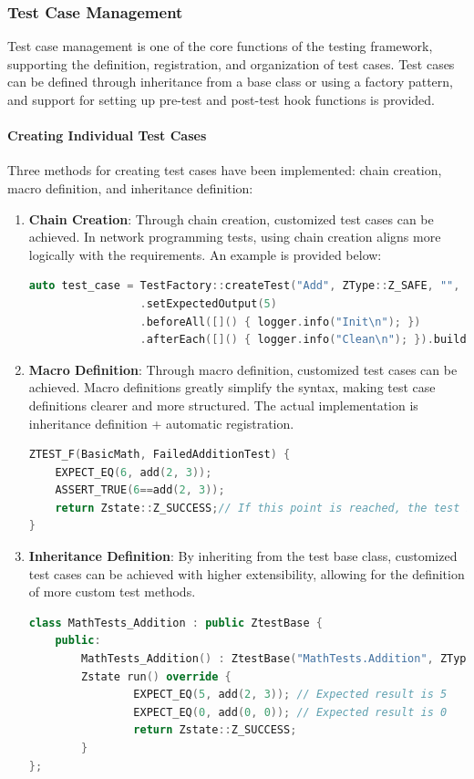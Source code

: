 \documentclass[english]{article}
\begin{document}
\subsubsection{Test Case Management}
Test case management is one of the core functions of the testing framework, supporting the definition, registration, and organization of test cases. Test cases can be defined through inheritance from a base class or using a factory pattern, and support for setting up pre-test and post-test hook functions is provided.

\paragraph{Creating Individual Test Cases}
Three methods for creating test cases have been implemented: chain creation, macro definition, and inheritance definition:

\begin{enumerate}
    \item \textbf{Chain Creation}: Through chain creation, customized test cases can be achieved. In network programming tests, using chain creation aligns more logically with the requirements. An example is provided below:
          \begin{lstlisting}[language=C++]
auto test_case = TestFactory::createTest("Add", ZType::Z_SAFE, "", add, 2, 3)
                 .setExpectedOutput(5)
                 .beforeAll([]() { logger.info("Init\n"); })          
                 .afterEach([]() { logger.info("Clean\n"); }).build();
                \end{lstlisting}
    \item \textbf{Macro Definition}: Through macro definition, customized test cases can be achieved. Macro definitions greatly simplify the syntax, making test case definitions clearer and more structured. The actual implementation is inheritance definition + automatic registration.
          \begin{lstlisting}[language=C++]
ZTEST_F(BasicMath, FailedAdditionTest) {
    EXPECT_EQ(6, add(2, 3));
    ASSERT_TRUE(6==add(2, 3));
    return Zstate::Z_SUCCESS;// If this point is reached, the test is successful
}
                \end{lstlisting}
    \item \textbf{Inheritance Definition}: By inheriting from the test base class, customized test cases can be achieved with higher extensibility, allowing for the definition of more custom test methods.
          \begin{lstlisting}[language=C++]
class MathTests_Addition : public ZtestBase {
    public:
        MathTests_Addition() : ZtestBase("MathTests.Addition", ZType::ZSAFE, "Test addition function") {}
        Zstate run() override {
                EXPECT_EQ(5, add(2, 3)); // Expected result is 5
                EXPECT_EQ(0, add(0, 0)); // Expected result is 0
                return Zstate::Z_SUCCESS;
        }
};
\end{lstlisting}
\end{enumerate}
\end{document}
